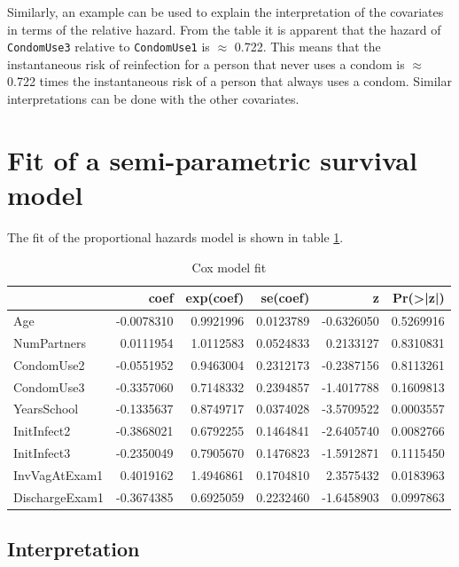 \documentclass[
]{article}
\begin{document}
Similarly, an example can be used to explain the interpretation of the covariates in terms of the relative hazard. From the table it is apparent that the hazard of \texttt{CondomUse3} relative to \texttt{CondomUse1} is \(\approx\) 0.722. This means that the instantaneous risk of reinfection for a person that never uses a condom is \(\approx\) 0.722 times the instantaneous risk of a person that always uses a condom. Similar interpretations can be done with the other covariates.

\hypertarget{fit-of-a-semi-parametric-survival-model}{%
\section{Fit of a semi-parametric survival model}\label{fit-of-a-semi-parametric-survival-model}}

The fit of the proportional hazards model is shown in table \ref{tab:Cox-model}.

\begin{table}

\caption{\label{tab:Cox-model}Cox model fit}
\centering
\begin{tabular}[t]{l|r|r|r|r|r}
\hline
  & coef & exp(coef) & se(coef) & z & Pr(>|z|)\\
\hline
Age & -0.0078310 & 0.9921996 & 0.0123789 & -0.6326050 & 0.5269916\\
\hline
NumPartners & 0.0111954 & 1.0112583 & 0.0524833 & 0.2133127 & 0.8310831\\
\hline
CondomUse2 & -0.0551952 & 0.9463004 & 0.2312173 & -0.2387156 & 0.8113261\\
\hline
CondomUse3 & -0.3357060 & 0.7148332 & 0.2394857 & -1.4017788 & 0.1609813\\
\hline
YearsSchool & -0.1335637 & 0.8749717 & 0.0374028 & -3.5709522 & 0.0003557\\
\hline
InitInfect2 & -0.3868021 & 0.6792255 & 0.1464841 & -2.6405740 & 0.0082766\\
\hline
InitInfect3 & -0.2350049 & 0.7905670 & 0.1476823 & -1.5912871 & 0.1115450\\
\hline
InvVagAtExam1 & 0.4019162 & 1.4946861 & 0.1704810 & 2.3575432 & 0.0183963\\
\hline
DischargeExam1 & -0.3674385 & 0.6925059 & 0.2232460 & -1.6458903 & 0.0997863\\
\hline
\end{tabular}
\end{table}

\hypertarget{interpretation-1}{%
\subsection{Interpretation}\label{interpretation-1}}
\end{document}
